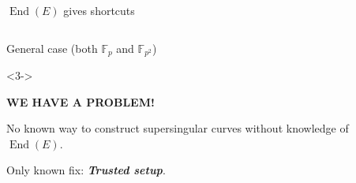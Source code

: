 \documentclass[aspectratio=169]{beamer}
\newcommand{\F}{\mathbb{F}}
\DeclareMathOperator{\End}{End}
\begin{document}
\begin{frame}{$\End(E)$ gives shortcuts}
\begin{columns}
\begin{column}{0.48\textwidth}
\begin{block}{General case (both $\F_p$ and $\F_{p^2}$)}
        \begin{uncoverenv}<3->
          \begin{center}
            \alert{\bf WE HAVE A PROBLEM!}
          \end{center}
          
          No known way to construct supersingular curves
          without knowledge of $\End(E)$.

          \medskip
          Only known fix: \emph{\bf Trusted setup}.

        \end{uncoverenv}
      \end{block}
    \end{column}
  \end{columns}
\end{frame}

\end{document}
